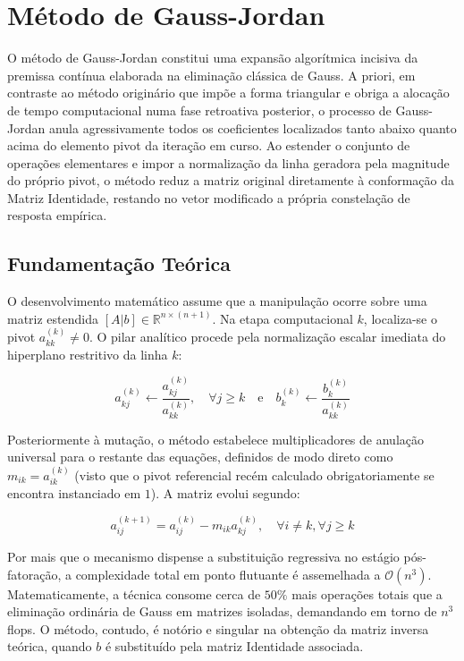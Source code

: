 \section{Método de Gauss-Jordan}

O método de Gauss-Jordan constitui uma expansão algorítmica incisiva da premissa contínua elaborada na eliminação clássica de Gauss. A priori, em contraste ao método originário que impõe a forma triangular e obriga a alocação de tempo computacional numa fase retroativa posterior, o processo de Gauss-Jordan anula agressivamente todos os coeficientes localizados tanto abaixo quanto acima do elemento pivot da iteração em curso. Ao estender o conjunto de operações elementares e impor a normalização da linha geradora pela magnitude do próprio pivot, o método reduz a matriz original diretamente à conformação da Matriz Identidade, restando no vetor modificado a própria constelação de resposta empírica. 

\subsection{Fundamentação Teórica}

O desenvolvimento matemático assume que a manipulação ocorre sobre uma matriz estendida $[A | b] \in \mathbb{R}^{n \times (n+1)}$. Na etapa computacional $k$, localiza-se o pivot $a_{kk}^{(k)} \neq 0$. O pilar analítico procede pela normalização escalar imediata do hiperplano restritivo da linha $k$:

\begin{equation}
    a_{kj}^{(k)} \leftarrow \frac{a_{kj}^{(k)}}{a_{kk}^{(k)}}, \quad \forall j \geq k \quad \text{e} \quad b_k^{(k)} \leftarrow \frac{b_k^{(k)}}{a_{kk}^{(k)}}
\end{equation}

Posteriormente à mutação, o método estabelece multiplicadores de anulação universal para o restante das equações, definidos de modo direto como $m_{ik} = a_{ik}^{(k)}$ (visto que o pivot referencial recém calculado obrigatoriamente se encontra instanciado em $1$). A matriz evolui segundo:

\begin{equation}
    a_{ij}^{(k+1)} = a_{ij}^{(k)} - m_{ik} a_{kj}^{(k)}, \quad \forall i \neq k, \forall j \geq k
\end{equation}

Por mais que o mecanismo dispense a substituição regressiva no estágio pós-fatoração, a complexidade total em ponto flutuante é assemelhada a $\mathcal{O}(n^3)$. Matematicamente, a técnica consome cerca de $50\%$ mais operações totais que a eliminação ordinária de Gauss em matrizes isoladas, demandando em torno de $n^3$ flops. O método, contudo, é notório e singular na obtenção da matriz inversa teórica, quando $b$ é substituído pela matriz Identidade associada.

